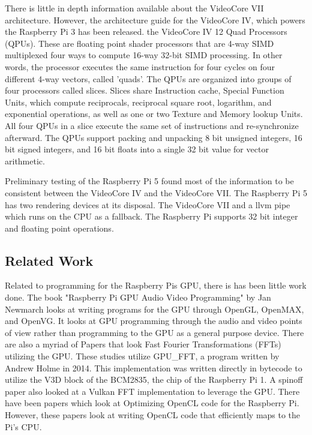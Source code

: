 \documentclass[conference]{IEEEtran}
\begin{document}
 There is little in depth information available about the VideoCore VII architecture. However, 
 the architecture guide for the VideoCore IV, which powers the Raspberry Pi 3 has been released\cite{broadcom2013videocore}.
 the VideoCore IV 12 Quad Processors (QPUs). These are floating point shader processors that 
 are 4-way SIMD multiplexed four ways to compute 16-way 32-bit SIMD processing. In other 
 words, the processor executes the same instruction for four cycles on four different 4-way vectors, 
 called 'quads'. The QPUs are organized into groups of four processors called slices. Slices share 
 Instruction cache, Special Function Units, which compute reciprocals, reciprocal square root, 
 logarithm, and exponential operations, as well as one or two Texture and Memory lookup Units.
 All four QPUs in a slice execute the same set of instructions and re-synchronize afterward.
 The QPUs support packing and unpacking 8 bit unsigned integers, 16 bit signed integers, and 16
 bit floats into a single 32 bit value for vector arithmetic.

 Preliminary testing of the Raspberry Pi 5 found most of the information to be consistent 
 between the VideoCore IV and the VideoCore VII. The Raspberry Pi 5 has two rendering devices 
 at its disposal. The VideoCore VII and a llvm pipe which runs on the CPU as a fallback. The 
 Raspberry Pi supports 32 bit integer and floating point operations. 

 \subsection{Related Work}

 Related to programming for the Raspberry Pis GPU, there is has been little work done. 
 The book "Raspberry Pi GPU Audio Video Programming" by Jan Newmarch looks at writing 
 programs for the GPU through OpenGL, OpenMAX, and OpenVG\cite{newmarch2017raspberry}. It looks at GPU programming 
 through the audio and video points of view rather than programming to the GPU as 
 a general purpose device. There are also a myriad of Papers that look Fast Fourier Transformations 
 (FFTs) utilizing the GPU. These studies utilize GPU\_FFT, a program written by Andrew Holme in 2014\cite{holme_gpu_fft}.
 This implementation was written directly in bytecode to utilize the V3D block of the BCM2835, the chip 
 of the Raspberry Pi 1. A spinoff paper also looked at a Vulkan FFT implementation to leverage the GPU\cite{he_comparing_2018}. 
 There have been papers which look at Optimizing OpenCL code for the Raspberry Pi. However, these papers
 look at writing OpenCL code that efficiently maps to the Pi's CPU.
\end{document}

